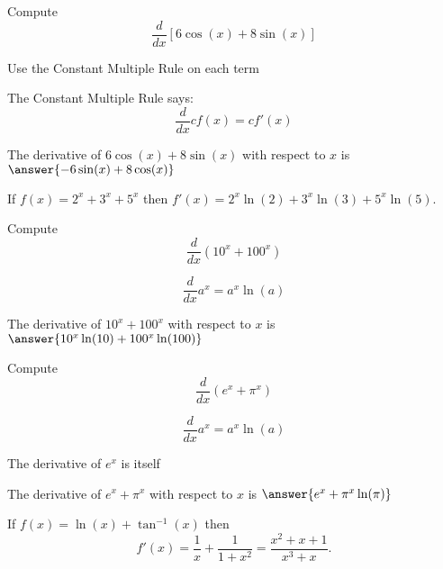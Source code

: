 \documentclass[handout]{ximera}
\begin{document}
\begin{problem} %
  Compute 
  \[
  \frac{d}{dx} \left[6\cos(x) + 8\sin(x)\right]
  \]
  
		\begin{hint}
      Use the Constant Multiple Rule on each term
    \end{hint}
    \begin{hint}
      The Constant Multiple Rule says:
      \[
      \frac{d}{dx} cf(x) = cf'(x)
      \]
    \end{hint}    
		The derivative of $6\cos(x) + 8\sin(x)$ with respect to $x$ is
		 $\answer{-6\sin(x) + 8\cos(x)}$
	
\end{problem}


\begin{example} %
 If $f(x) = 2^x + 3^x + 5^x$ then $f'(x) = 2^x\ln(2) + 3^x\ln(3) + 5^x\ln(5)$.
\end{example}


\begin{problem} %
  Compute 
  \[
  \frac{d}{dx} \left(10^x + 100^x\right)
  \]
  
    \begin{hint}
      \[
      \frac{d}{dx} a^x = a^x \ln(a)
      \]
    \end{hint}    
		The derivative of $10^x + 100^x$ with respect to $x$ is
		 $\answer{10^x \ln(10) + 100^x \ln(100)}$
	
\end{problem}

\begin{problem} %
  Compute 
  \[
  \frac{d}{dx} \left(e^x + \pi^x\right)
  \]
  
    \begin{hint}
      \[
      \frac{d}{dx} a^x = a^x \ln(a)
      \]
    \end{hint}
		\begin{hint}
		  The derivative of $e^x$ is itself
		\end{hint}
		The derivative of $e^x + \pi^x$ with respect to $x$ is
		 $\answer{e^x  + \pi^x \ln(\pi)}$
	
\end{problem}


\begin{example} %
 If $f(x) = \ln(x) + \tan^{-1}(x)$ then 
\[f'(x) = \frac{1}{x} + \frac{1}{1+x^2} = \frac{x^2 + x + 1}{x^3 + x}.\]
\end{example}
\end{document}
